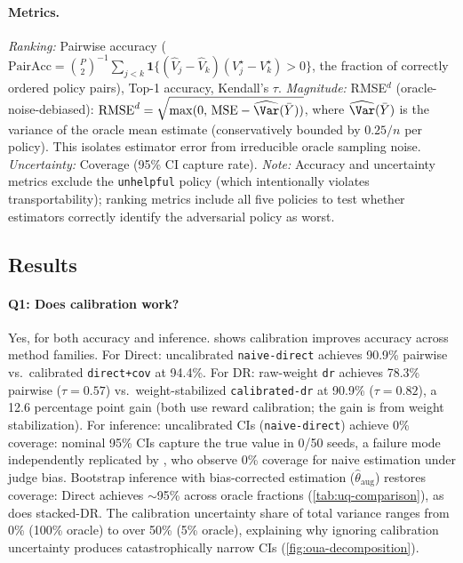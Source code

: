 \paragraph{Metrics.}
\emph{Ranking:} Pairwise accuracy ($\text{PairAcc} = \binom{P}{2}^{-1}\sum_{j<k}\mathbf{1}\{(\hat V_j - \hat V_k)(V^\star_j - V^\star_k) > 0\}$, the fraction of correctly ordered policy pairs), Top-1 accuracy, Kendall's $\tau$.
\emph{Magnitude:} RMSE$^d$ (oracle-noise-debiased): $\mathrm{RMSE}^d = \sqrt{\max(0,\, \mathrm{MSE} - \widehat{\Var}(\bar Y))}$, where $\widehat{\Var}(\bar Y)$ is the variance of the oracle mean estimate (conservatively bounded by $0.25/n$ per policy). This isolates estimator error from irreducible oracle sampling noise.
\emph{Uncertainty:} Coverage (95\% CI capture rate).
\emph{Note:} Accuracy and uncertainty metrics exclude the \texttt{unhelpful} policy (which intentionally violates transportability); ranking metrics include all five policies to test whether estimators correctly identify the adversarial policy as worst.

\subsection{Results}
\label{ssec:exp-results}



\paragraph{Q1: Does calibration work?}
Yes, for both accuracy and inference.  shows calibration improves accuracy across method families.
For Direct: uncalibrated \texttt{naive-direct} achieves 90.9\% pairwise vs.\ calibrated \texttt{direct+cov} at 94.4\%.
For DR: raw-weight \texttt{dr} achieves 78.3\% pairwise ($\tau{=}0.57$) vs.\ weight-stabilized \texttt{calibrated-dr} at 90.9\% ($\tau{=}0.82$), a 12.6 percentage point gain (both use reward calibration; the gain is from weight stabilization).
For inference: uncalibrated CIs (\texttt{naive-direct}) achieve 0\% coverage: nominal 95\% CIs capture the true value in 0/50 seeds, a failure mode independently replicated by \citet{Chen2026EfficientLLMJudge}, who observe 0\% coverage for naive estimation under judge bias.
Bootstrap inference with bias-corrected estimation ($\hat\theta_{\mathrm{aug}}$) restores coverage: Direct achieves ${\sim}$95\% across oracle fractions (\cref{tab:uq-comparison}), as does stacked-DR.
The calibration uncertainty share of total variance ranges from 0\% (100\% oracle) to over 50\% (5\% oracle), explaining why ignoring calibration uncertainty produces catastrophically narrow CIs (\cref{fig:oua-decomposition}).

